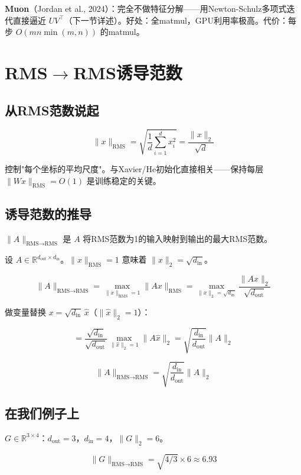 \documentclass[12pt,a4paper]{article}
\begin{document}
\textbf{Muon}（Jordan et al., 2024）：完全不做特征分解——用Newton-Schulz多项式迭代直接逼近 $UV^\top$（下一节详述）。好处：全matmul，GPU利用率极高。代价：每步 $O(mn\min(m,n))$ 的matmul。




\section{RMS$\to$RMS诱导范数}


\subsection{从RMS范数说起}


\[\|x\|_{\text{RMS}} = \sqrt{\frac{1}{d}\sum_{i=1}^d x_i^2} = \frac{\|x\|_2}{\sqrt{d}}\]

控制"每个坐标的平均尺度"。与Xavier/He初始化直接相关——保持每层 $\|Wx\|_{\text{RMS}} = O(1)$ 是训练稳定的关键。


\subsection{诱导范数的推导}

$\|A\|_{\text{RMS}\to\text{RMS}}$ 是 $A$ 将RMS范数为1的输入映射到输出的最大RMS范数。

设 $A \in \mathbb{R}^{d_{\text{out}} \times d_{\text{in}}}$。$\|x\|_{\text{RMS}} = 1$ 意味着 $\|x\|_2 = \sqrt{d_{\text{in}}}$。


\[\|A\|_{\text{RMS}\to\text{RMS}} = \max_{\|x\|_{\text{RMS}}=1} \|Ax\|_{\text{RMS}} = \max_{\|x\|_2 = \sqrt{d_{\text{in}}}} \frac{\|Ax\|_2}{\sqrt{d_{\text{out}}}}\]

做变量替换 $x = \sqrt{d_{\text{in}}}\,\hat{x}$（$\|\hat{x}\|_2 = 1$）：


\[= \frac{\sqrt{d_{\text{in}}}}{\sqrt{d_{\text{out}}}} \max_{\|\hat{x}\|_2=1} \|A\hat{x}\|_2 = \sqrt{\frac{d_{\text{in}}}{d_{\text{out}}}} \|A\|_2\]


\[\boxed{\|A\|_{\text{RMS}\to\text{RMS}} = \sqrt{\frac{d_{\text{in}}}{d_{\text{out}}}} \|A\|_2}\]


\subsection{在我们例子上}

$G \in \mathbb{R}^{3 \times 4}$：$d_{\text{out}}=3$，$d_{\text{in}}=4$，$\|G\|_2 = 6$。


\[\|G\|_{\text{RMS}\to\text{RMS}} = \sqrt{4/3} \times 6 \approx 6.93\]
\end{document}
